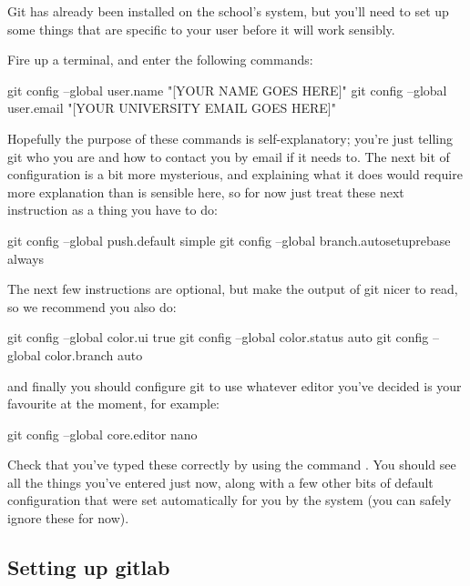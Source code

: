 Git has already been installed on the school's system, but you'll need to set up some things that are specific to your user before it will work sensibly. 

Fire up a terminal, and enter the following commands:

\begin{ttoutenv}
git config --global user.name "[YOUR NAME GOES HERE]"
git config --global user.email "[YOUR UNIVERSITY EMAIL GOES HERE]" 
\end{ttoutenv}

Hopefully the purpose of these commands is self-explanatory; you're just telling git who you are and how to contact you by email if it needs to. The next bit of configuration is a bit more mysterious, and explaining what it does would require more explanation than is sensible here, so for now just treat these next instruction as a thing you have to do:

\begin{ttoutenv}
git config --global push.default simple
git config --global branch.autosetuprebase always 
\end{ttoutenv}

The next few instructions are optional, but make the output of git nicer to read, so we recommend you also do:

\begin{ttoutenv}
git config --global color.ui true
git config --global color.status auto
git config --global color.branch auto 
\end{ttoutenv}

and finally you should configure git to use whatever editor you've decided is your favourite at the moment, for example:

\begin{ttoutenv}
git config --global core.editor nano 
\end{ttoutenv}

Check that you've typed these correctly by using the command . You should see all the things you've entered just now, along with a few other bits of default configuration that were set automatically for you by the system (you can safely ignore these for now).


\subsection{Setting up gitlab}

